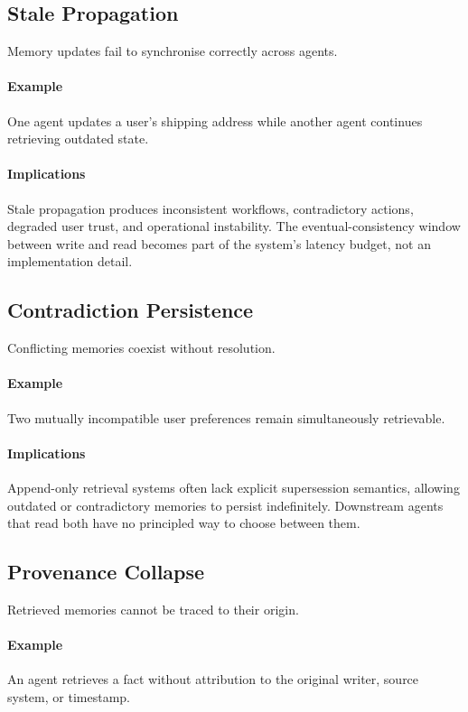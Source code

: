 \documentclass[10pt,twocolumn,letterpaper]{article}
\begin{document}
\subsection{Stale Propagation}

Memory updates fail to synchronise correctly across agents.

\paragraph{Example}
One agent updates a user's shipping address while another agent continues retrieving outdated state.

\paragraph{Implications}
Stale propagation produces inconsistent workflows, contradictory actions, degraded user trust, and operational instability. The eventual-consistency window between write and read becomes part of the system's latency budget, not an implementation detail.

\subsection{Contradiction Persistence}

Conflicting memories coexist without resolution.

\paragraph{Example}
Two mutually incompatible user preferences remain simultaneously retrievable.

\paragraph{Implications}
Append-only retrieval systems often lack explicit supersession semantics, allowing outdated or contradictory memories to persist indefinitely. Downstream agents that read both have no principled way to choose between them.

\subsection{Provenance Collapse}

Retrieved memories cannot be traced to their origin.

\paragraph{Example}
An agent retrieves a fact without attribution to the original writer, source system, or timestamp.
\end{document}
